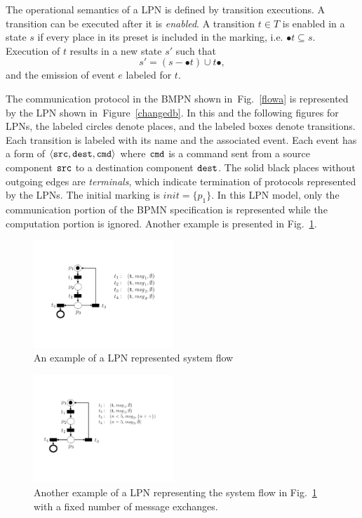 \documentclass[12pt,frontmatter,copyright,thesis]{usfmanus}
\begin{document}
 The operational semantics of a LPN is defined by transition executions.  A transition can be executed after it is {\em enabled}.  A transition $t \in T$ is enabled in a state $s$ if every place in its preset is included in the marking, i.e. $\bullet{t} \subseteq s$.  Execution of $t$ results in a new state $s'$ such that 
 \[
 s' = (s - \bullet{t}) \cup t\bullet,
 \]
 and the emission of event $e$ labeled for $t$. 

 The communication protocol in the BMPN shown
 in~Fig.~\ref{flowa} is represented by the LPN
 shown in~Figure~\ref{changedb}.  In this and the
 following figures for LPNs, the labeled circles denote
 places, and the labeled boxes denote transitions.  Each
 transition is labeled with its name and the associated
 event.  Each event has a form of $\langle {\tt src, dest,
   cmd} \rangle$ where ${\tt cmd}$ is a command sent from a
 source component ${\tt src}$ to a destination component
 ${\tt dest}$. The solid black places without outgoing edges
 are {\em terminals}, which indicate termination of protocols
 represented by the LPNs.  The initial marking is
 $\mathit{init} = \{p_1\}$.  In this LPN model, only the
 communication portion of the BPMN specification is
 represented while the computation portion is ignored.
 Another example is presented in Fig.~\ref{fig-flow-ex-1}.


 \begin{figure}
\centering
\includegraphics[height=1.6in]{figures/flow-ex-1}
 \caption{An example of a LPN represented system flow}
 \label{fig-flow-ex-1}
\end{figure}

 \begin{figure}[h]
 \begin{center}
 \includegraphics[height=1.6in]{figures/flow-ex-2}
 \caption{Another example of a LPN representing the system flow in Fig.~\ref{fig-flow-ex-1} with a fixed number of message exchanges.}
 \label{fig-flow-ex-2}
 \end{center}
 \end{figure}
\end{document}
